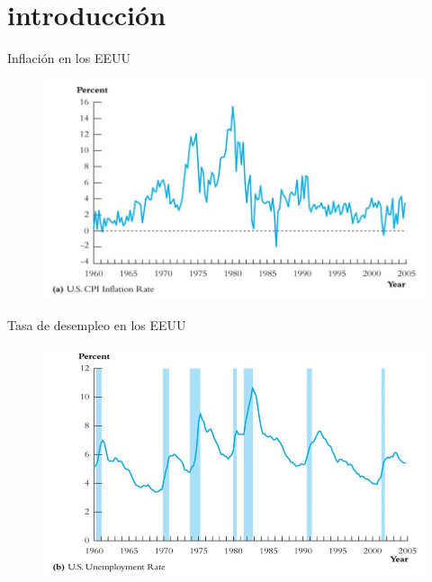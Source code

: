 \section{introducción}

\begin{frame}{Inflación en los EEUU}
	\centering
		\begin{figure}
			\includegraphics[width = 0.9\linewidth]{fig/figure1.jpg}
		\end{figure}
\end{frame}
\begin{frame}{Tasa de desempleo en los EEUU}
	\centering
		\begin{figure}
			\includegraphics[width = 0.9\linewidth]{fig/figure2.jpg}
		\end{figure}
\end{frame}



